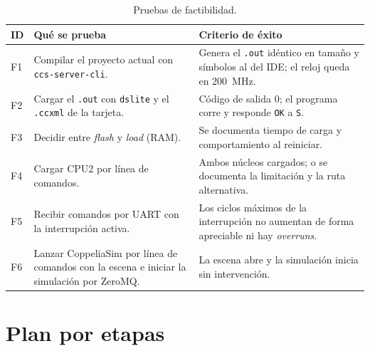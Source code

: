 \documentclass[12pt,letterpaper]{article}
\begin{document}
\begin{table}[!htbp]
\centering
\caption{Pruebas de factibilidad.}
\label{tab:factibilidad}
\begin{tabularx}{\textwidth}{>{\raggedright\arraybackslash}p{1.0cm}YY}
\toprule
\textbf{ID} & \textbf{Qué se prueba} & \textbf{Criterio de éxito} \\
\midrule
F1 & Compilar el proyecto actual con \texttt{ccs-server-cli}. & Genera el \texttt{.out} idéntico en tamaño y símbolos al del IDE; el reloj queda en 200~MHz. \\
F2 & Cargar el \texttt{.out} con \texttt{dslite} y el \texttt{.ccxml} de la tarjeta. & Código de salida 0; el programa corre y responde \texttt{OK} a \texttt{S}. \\
F3 & Decidir entre \textit{flash} y \textit{load} (RAM). & Se documenta tiempo de carga y comportamiento al reiniciar. \\
F4 & Cargar CPU2 por línea de comandos. & Ambos núcleos cargados; o se documenta la limitación y la ruta alternativa. \\
F5 & Recibir comandos por UART con la interrupción activa. & Los ciclos máximos de la interrupción no aumentan de forma apreciable ni hay \textit{overruns}. \\
F6 & Lanzar CoppeliaSim por línea de comandos con la escena e iniciar la simulación por ZeroMQ. & La escena abre y la simulación inicia sin intervención. \\
\bottomrule
\end{tabularx}
\end{table}

\section{Plan por etapas}
\label{sec:plan}
\end{document}
